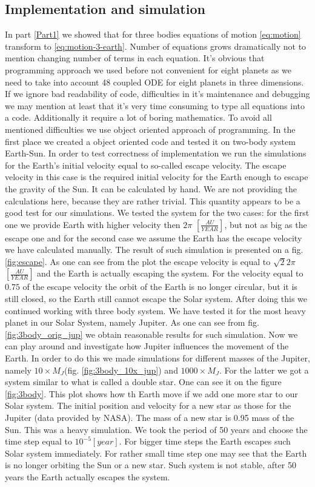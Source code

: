 \documentclass[10pt]{article}
\begin{document}
\newpage
\subsection{Implementation and simulation}
In part \ref{Part1} we showed that for three bodies equations of motion \ref{eq:motion} transform to \ref{eq:motion-3-earth}. Number of equations grows dramatically not to mention changing number of terms in each equation. It's obvious that programming approach we used before not convenient for eight planets as we need to take into account 48 coupled ODE for eight planets in three dimensions.
If we ignore bad readability of code, difficulties in it's maintenance and debugging we may mention at least that it's very time consuming to type all equations into a code. Additionally it require a lot of boring mathematics. To avoid all mentioned difficulties we use object oriented approach of programming. In the first place we created a object oriented code and tested it on two-body system Earth-Sun. In order to test correctness of implementation we run the simulations for the Earth's initial velocity equal to so-called escape velocity. The escape velocity in this case is the required initial velocity for the Earth enough to escape the gravity of the Sun. It can be calculated by hand. We are not providing the calculations here, because they are rather trivial. This quantity appears to be a good test for our simulations. We tested the system for the two cases: for the first one we provide Earth with higher velocity then $2\pi$ $ [\frac{AU}{YEAR}]$, but not as big as the escape one and for the second case we assume the Earth has the escape velocity we have calculated manually. The result of such simulation is presented on a fig. \ref{fig:escape}. As one can see from the plot the escape velocity is equal to $\sqrt{2}2\pi $ $[\frac{AU}{YEAR}]$ and the Earth is actually escaping the system. For the velocity equal to $0.75$ of the escape velocity the orbit of the Earth is no longer circular, but it is still closed, so the Earth still cannot escape the Solar system.
After doing this we continued working with three body system. We have tested it for the most heavy planet in our Solar System, namely Jupiter. As one can see from fig. \ref{fig:3body_orig_jup} we obtain reasonable results for such simulation. Now we can play around and investigate how Jupiter influences the movement of the Earth. In order to do this we made simulations for different masses of the Jupiter, namely $10\times M_{J}$(fig. \ref{fig:3body_10x_jup}) and $1000\times M_{J}$. For the latter we got a system similar to what is called a double star. One can see it on the figure \ref{fig:3body}. This plot shows how th Earth move if we add one more star to our Solar system. The initial position and velocity for a new star as those for the Jupiter (data provided by NASA\cite{three}). The mass of a new star is 0.95 mass of the Sun. This was a heavy simulation. We took the period of 50 years and choose the time step equal to $10^{-5} [year]$. For bigger time steps the Earth escapes such Solar system immediately. For rather small time step one may see that the Earth is no longer orbiting the Sun or a new star. Such system is not stable, after 50 years the Earth actually escapes the system.
\end{document}
